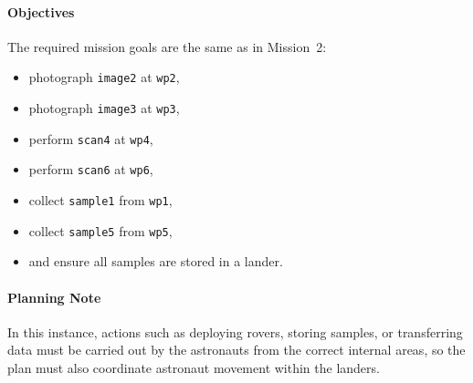 \documentclass[11pt,a4paper]{article}
\begin{document}
\paragraph{Objectives}
The required mission goals are the same as in Mission~2:
\begin{itemize}
  \item photograph \texttt{image2} at \texttt{wp2},
  \item photograph \texttt{image3} at \texttt{wp3},
  \item perform \texttt{scan4} at \texttt{wp4},
  \item perform \texttt{scan6} at \texttt{wp6},
  \item collect \texttt{sample1} from \texttt{wp1},
  \item collect \texttt{sample5} from \texttt{wp5},
  \item and ensure all samples are stored in a lander.
\end{itemize}

\paragraph{Planning Note}
In this instance, actions such as deploying rovers, storing samples, or transferring data must be carried out by the astronauts from the correct internal areas, so the plan must also coordinate astronaut movement within the landers.
\end{document}
